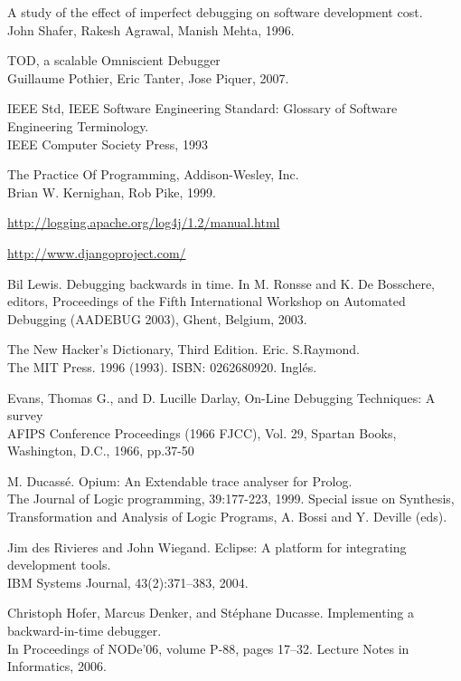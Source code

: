 \documentclass[12pt,legalpaper]{report}
\begin{document}
\begin{thebibliography}{30}

 A study of the effect of  imperfect debugging on software development cost.\\
John Shafer, Rakesh Agrawal, Manish Mehta, 1996.

 TOD, a scalable Omniscient Debugger\\
Guillaume Pothier, Eric Tanter, Jose Piquer, 2007.

 IEEE Std, IEEE Software Engineering Standard: Glossary of Software Engineering Terminology.\\
IEEE Computer Society Press, 1993

 The Practice Of Programming, Addison-Wesley, Inc.\\
Brian W. Kernighan, Rob Pike, 1999. 

\href{http://logging.apache.org/log4j/1.2/manual.html}{http://logging.apache.org/log4j/1.2/manual.html}

\href{http://www.djangoproject.com/}{http://www.djangoproject.com/}

 Bil Lewis. Debugging backwards in time. In M. Ronsse and K. De Bosschere,
editors, Proceedings of the Fifth International Workshop on Automated Debugging
(AADEBUG 2003), Ghent, Belgium, 2003.

 The New Hacker's Dictionary,  Third Edition. Eric. S.Raymond. \\
The MIT Press. 1996 (1993). ISBN: 0262680920. Inglés.

 Evans, Thomas G., and D. Lucille Darlay, On-Line Debugging Techniques: A survey\\
AFIPS Conference Proceedings (1966 FJCC), Vol. 29, Spartan Books, Washington, D.C., 1966, pp.37-50

 M. Ducassé. Opium: An Extendable trace analyser for Prolog.\\
The Journal of Logic programming, 39:177-223, 1999. Special issue on Synthesis, Transformation and Analysis of Logic Programs, A. Bossi and Y. Deville (eds).

 Jim des Rivieres and John Wiegand. Eclipse: A platform for integrating development tools.\\
IBM Systems Journal, 43(2):371–383, 2004.

Christoph Hofer, Marcus Denker, and Stéphane Ducasse. Implementing a backward-in-time debugger. \\
In Proceedings of NODe’06, volume P-88, pages 17–32. Lecture Notes in Informatics, 2006.


\end{thebibliography}
\end{document}
